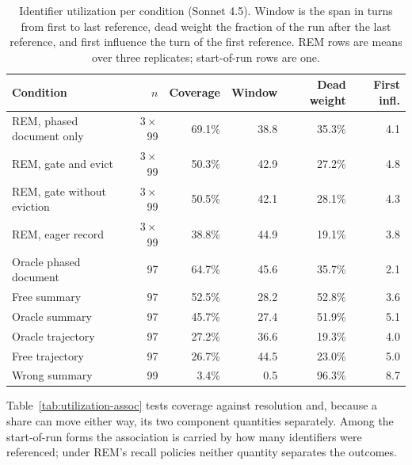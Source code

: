 \documentclass{article}
\newcommand{\sysname}{REM}
\begin{document}
\begin{table}[h]
\begin{center}
\begin{tabular}{@{}lrrrrr@{}}
\toprule
\textbf{Condition} & $n$ & \textbf{Coverage} & \textbf{Window} & \textbf{Dead weight} & \textbf{First infl.} \\
\midrule
\sysname{}, phased document only & $3\times$99 & 69.1\% & 38.8 & 35.3\% & 4.1 \\
\sysname{}, gate and evict & $3\times$99 & 50.3\% & 42.9 & 27.2\% & 4.8 \\
\sysname{}, gate without eviction & $3\times$99 & 50.5\% & 42.1 & 28.1\% & 4.3 \\
\sysname{}, eager record & $3\times$99 & 38.8\% & 44.9 & 19.1\% & 3.8 \\
\midrule
Oracle phased document & 97 & 64.7\% & 45.6 & 35.7\% & 2.1 \\
Free summary & 97 & 52.5\% & 28.2 & 52.8\% & 3.6 \\
Oracle summary & 97 & 45.7\% & 27.4 & 51.9\% & 5.1 \\
Oracle trajectory & 97 & 27.2\% & 36.6 & 19.3\% & 4.0 \\
Free trajectory & 97 & 26.7\% & 44.5 & 23.0\% & 5.0 \\
Wrong summary & 99 & 3.4\% & 0.5 & 96.3\% & 8.7 \\
\bottomrule
\end{tabular}
\end{center}
\caption{Identifier utilization per condition (Sonnet 4.5). Window is the span in turns from first to last reference, dead weight the fraction of the run after the last reference, and first influence the turn of the first reference. \sysname{} rows are means over three replicates; start-of-run rows are one.}
\label{tab:utilization}
\end{table}

Table~\ref{tab:utilization-assoc} tests coverage against resolution and, because a share can move either way, its two component quantities separately. Among the start-of-run forms the association is carried by how many identifiers were referenced; under \sysname{}'s recall policies neither quantity separates the outcomes.
\end{document}
